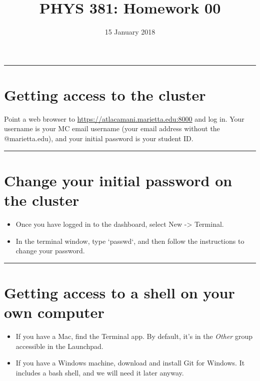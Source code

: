 \documentclass{tufte-handout}
\date{15 January 2018}
\title{PHYS 381: Homework 00}
\begin{document}
\maketitle
\rule{\linewidth}{0.5pt}
\section{Getting access to the cluster}
\label{sec-1}
Point a web browser to \url{https://atlacamani.marietta.edu:8000} and log in. Your username is your MC email username (your email address without the @marietta.edu), and your initial password is your student ID.

\rule{\linewidth}{0.5pt}
\section{Change your initial password on the cluster}
\label{sec-2}
\begin{itemize}
\item Once you have logged in to the dashboard, select New -> Terminal.
\item In the terminal window, type `passwd`, and then follow the instructions to change your password.
\end{itemize}

\rule{\linewidth}{0.5pt}
\section{Getting access to a shell on your own computer}
\label{sec-3}
\begin{itemize}
\item If you have a Mac, find the Terminal app. By default, it's in the \emph{Other} group accessible in the Launchpad.
\item If you have a Windows machine, download and install Git for Windows. It includes a bash shell, and we will need it later anyway.
\end{itemize}
\end{document}
